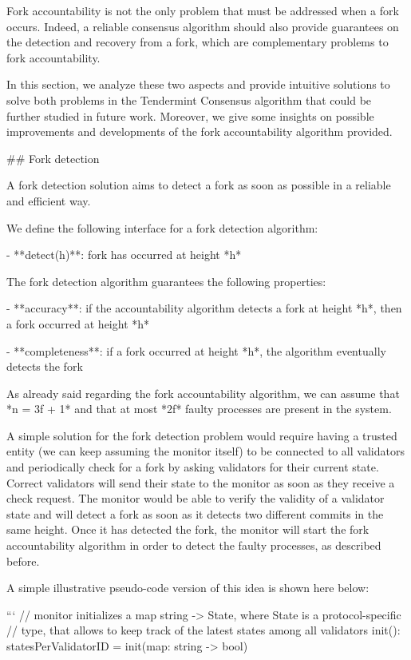 \documentclass[a4paper,11pt,oneside]{report}
\begin{document}
\begin{markdown}

Fork accountability is not the only problem that must be addressed when a fork occurs. Indeed, a reliable consensus algorithm should also provide guarantees on the detection and recovery from a fork, which are complementary problems to fork accountability. 

In this section, we analyze these two aspects and provide intuitive solutions to solve both problems in the Tendermint Consensus algorithm that could be further studied in future work. Moreover, we give some insights on possible improvements and developments of the fork accountability algorithm provided.

## Fork detection

A fork detection solution aims to detect a fork as soon as possible in a reliable and efficient way.

We define the following interface for a fork detection algorithm:

- **detect(h)**: fork has occurred at height *h*

The fork detection algorithm guarantees the following properties:

- **accuracy**: if the accountability algorithm detects a fork at height *h*, then a fork occurred at height *h*

- **completeness**: if a fork occurred at height *h*, the algorithm eventually detects the fork

As already said regarding the fork accountability algorithm, we can assume that *n = 3f + 1* and that at most *2f* faulty processes are present in the system.

A simple solution for the fork detection problem would require having a trusted entity (we can keep assuming the monitor itself) to be connected to all validators and periodically check for a fork by asking validators for their current state.
Correct validators will send their state to the monitor as soon as they receive a check request. The monitor would be able to verify the validity of a validator state and will detect a fork as soon as it detects two different commits in the same height.
Once it has detected the fork, the monitor will start the fork accountability algorithm in order to detect the faulty processes, as described before.

A simple illustrative pseudo-code version of this idea is shown here below:

    ```
    // monitor initializes a map string -> State, where State is a protocol-specific
    // type, that allows to keep track of the latest states among all validators
    init():
	    statesPerValidatorID = init(map: string -> bool)


\end{markdown}
\end{document}

